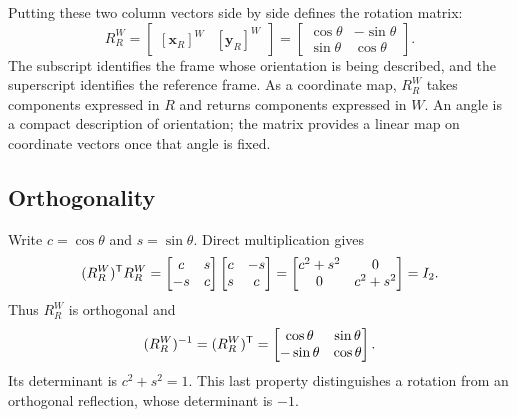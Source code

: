 Putting these two column vectors side by side defines the rotation matrix:
\begin{equation}
 \boxed{R_R^W
 =\begin{bmatrix}[\boldsymbol{x}_R]^W &[\boldsymbol{y}_R]^W\end{bmatrix}
 =\begin{bmatrix}\cos\theta&-\sin\theta\\\sin\theta&\cos\theta\end{bmatrix}.}
 \label{eq:l02-rotation}
\end{equation}
The subscript identifies the frame whose orientation is being described, and
the superscript identifies the reference frame. As a coordinate map, $R_R^W$
takes components expressed in $R$ and returns components expressed in $W$.
An angle is a compact description of orientation; the matrix provides a linear
map on coordinate vectors once that angle is fixed.

\subsection{Orthogonality}
Write $c=\cos\theta$ and $s=\sin\theta$. Direct multiplication gives
\[
 (R_R^W)^{\mathsf T} R_R^W
 =\begin{bmatrix}c&s\\-s&c\end{bmatrix}
  \begin{bmatrix}c&-s\\s&c\end{bmatrix}
 =\begin{bmatrix}c^2+s^2&0\\0&c^2+s^2\end{bmatrix}=I_2.
\]
Thus $R_R^W$ is orthogonal and
\begin{equation}
 (R_R^W)^{-1}=(R_R^W)^{\mathsf T}
 =\begin{bmatrix}\cos\theta&\sin\theta\\-\sin\theta&\cos\theta\end{bmatrix}.
 \label{eq:l02-inverse}
\end{equation}
Its determinant is $c^2+s^2=1$. This last property distinguishes a rotation
from an orthogonal reflection, whose determinant is $-1$.

